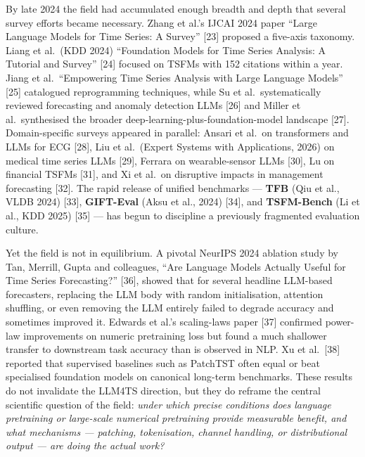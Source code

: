 By late 2024 the field had accumulated enough breadth and depth that several survey efforts became necessary. Zhang et al.'s IJCAI 2024 paper ``Large Language Models for Time Series: A Survey'' {[}23{]} proposed a five-axis taxonomy. Liang et al.~(KDD 2024) ``Foundation Models for Time Series Analysis: A Tutorial and Survey'' {[}24{]} focused on TSFMs with 152 citations within a year. Jiang et al.~``Empowering Time Series Analysis with Large Language Models'' {[}25{]} catalogued reprogramming techniques, while Su et al.~systematically reviewed forecasting and anomaly detection LLMs {[}26{]} and Miller et al.~synthesised the broader deep-learning-plus-foundation-model landscape {[}27{]}. Domain-specific surveys appeared in parallel: Ansari et al.~on transformers and LLMs for ECG {[}28{]}, Liu et al.~(Expert Systems with Applications, 2026) on medical time series LLMs {[}29{]}, Ferrara on wearable-sensor LLMs {[}30{]}, Lu on financial TSFMs {[}31{]}, and Xi et al.~on disruptive impacts in management forecasting {[}32{]}. The rapid release of unified benchmarks --- \textbf{TFB} (Qiu et al., VLDB 2024) {[}33{]}, \textbf{GIFT-Eval} (Aksu et al., 2024) {[}34{]}, and \textbf{TSFM-Bench} (Li et al., KDD 2025) {[}35{]} --- has begun to discipline a previously fragmented evaluation culture.

Yet the field is not in equilibrium. A pivotal NeurIPS 2024 ablation study by Tan, Merrill, Gupta and colleagues, ``Are Language Models Actually Useful for Time Series Forecasting?'' {[}36{]}, showed that for several headline LLM-based forecasters, replacing the LLM body with random initialisation, attention shuffling, or even removing the LLM entirely failed to degrade accuracy and sometimes improved it. Edwards et al.'s scaling-laws paper {[}37{]} confirmed power-law improvements on numeric pretraining loss but found a much shallower transfer to downstream task accuracy than is observed in NLP. Xu et al.~{[}38{]} reported that supervised baselines such as PatchTST often equal or beat specialised foundation models on canonical long-term benchmarks. These results do not invalidate the LLM4TS direction, but they do reframe the central scientific question of the field: \emph{under which precise conditions does language pretraining or large-scale numerical pretraining provide measurable benefit, and what mechanisms --- patching, tokenisation, channel handling, or distributional output --- are doing the actual work?}

